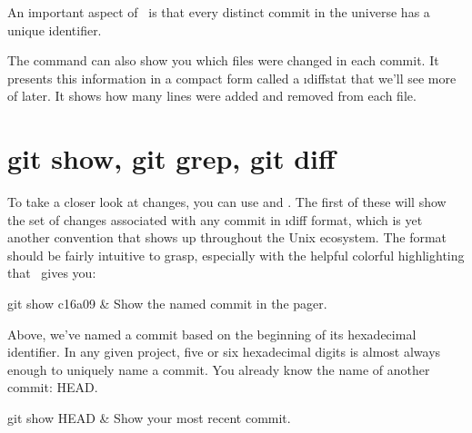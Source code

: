 \documentclass[letterpaper,12pt,titlepage,twoside]{article}
\begin{document}


An important aspect of \git\ is that every distinct commit in the universe has
a unique identifier.


The  command can also show you which files were changed in each
commit. It presents this information in a compact form called a \i{diffstat}
that we'll see more of later. It shows how many lines were added and removed
from each file.




\section{git show, git grep, git diff}

To take a closer look at changes, you can use  and .
The first of these will show the set of changes associated with any commit in
\i{diff format}, which is yet another convention that shows up throughout the
Unix ecosystem. The format should be fairly intuitive to grasp, especially
with the helpful colorful highlighting that \git\ gives you:

\begin{typeme}
git show c16a09 & Show the named commit in the pager.
\end{typeme}

Above, we've named a commit based on the beginning of its hexadecimal
identifier. In any given project, five or six hexadecimal digits is almost
always enough to uniquely name a commit. You already know the name of another
commit: HEAD.

\begin{typeme}
git show HEAD & Show your most recent commit.
\end{typeme}
\end{document}
